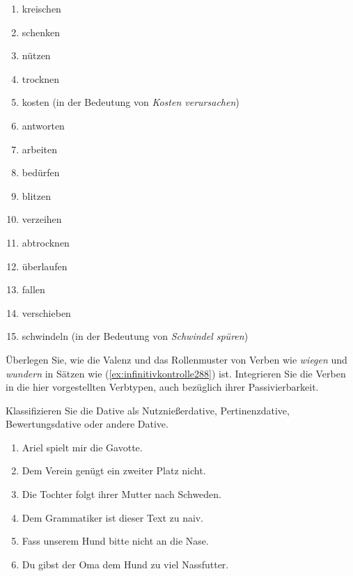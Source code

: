 \begin{enumerate}
  \item kreischen
  \item schenken
  \item nützen
  \item trocknen
  \item kosten (in der Bedeutung von \textit{Kosten verursachen})
  \item antworten
  \item arbeiten
  \item bedürfen
  \item blitzen
  \item verzeihen
  \item abtrocknen
  \item überlaufen
  \item fallen
  \item verschieben
  \item schwindeln (in der Bedeutung von \textit{Schwindel spüren})
\end{enumerate}


 \label{exc:relationenundpraedikate03} Überlegen Sie, wie die Valenz und das Rollenmuster von Verben wie \textit{wiegen} und \textit{wundern} in Sätzen wie (\ref{ex:infinitivkontrolle288}) ist.
Integrieren Sie die Verben in die hier vorgestellten Verbtypen, auch bezüglich ihrer Passivierbarkeit.

\begin{exe}
  \ex\label{ex:infinitivkontrolle288}
  \begin{xlist}
  \end{xlist}
\end{exe}

 \label{exc:relationenundpraedikate04} Klassifizieren Sie die Dative als Nutznießerdative, Pertinenzdative, Bewertungsdative oder andere Dative.

\begin{enumerate}
  \item Ariel spielt mir die Gavotte.
  \item Dem Verein genügt ein zweiter Platz nicht.
  \item Die Tochter folgt ihrer Mutter nach Schweden.
  \item Dem Grammatiker ist dieser Text zu naiv.
  \item Fass unserem Hund bitte nicht an die Nase.
  \item Du gibst der Oma dem Hund zu viel Nassfutter.
\end{enumerate}

